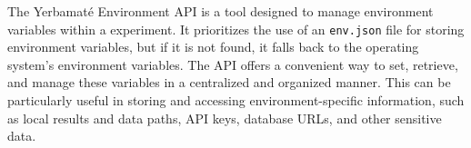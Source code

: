 The Yerbamaté Environment API is a tool designed to manage environment variables within a experiment. It prioritizes the use of an \texttt{env.json} file for storing environment variables, but if it is not found, it falls back to the operating system's environment variables. The API offers a convenient way to set, retrieve, and manage these variables in a centralized and organized manner. This can be particularly useful in storing and accessing environment-specific information, such as local results and data paths, API keys, database URLs, and other sensitive data.







